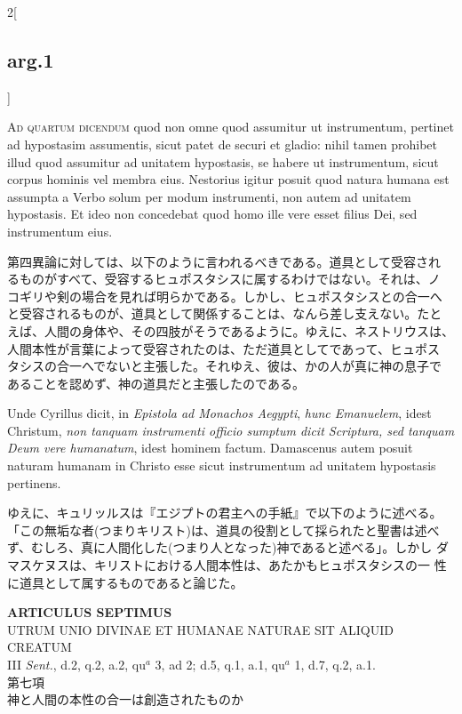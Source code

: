 \documentclass[paper=a4paper,fontsize=10pt,jafontsize=9pt,titlepage]{jlreq}
\begin{document}
\begin{paracol}{2}[\subsection{arg.1}]
\switchcolumn*[\subsection{ad.4}]

{\scshape Ad quartum dicendum} quod non omne quod assumitur ut
instrumentum, pertinet ad hypostasim assumentis, sicut patet de securi
et gladio: nihil tamen prohibet illud quod assumitur ad unitatem
hypostasis, se habere ut instrumentum, sicut corpus hominis vel membra
eius. Nestorius igitur posuit quod natura humana est assumpta a Verbo
solum per modum instrumenti, non autem ad unitatem hypostasis.  Et
ideo non concedebat quod homo ille vere esset filius Dei, sed
instrumentum eius.

\switchcolumn

第四異論に対しては、以下のように言われるべきである。道具として受容され
るものがすべて、受容するヒュポスタシスに属するわけではない。それは、ノ
コギリや剣の場合を見れば明らかである。しかし、ヒュポスタシスとの合一へ
と受容されるものが、道具として関係することは、なんら差し支えない。たと
えば、人間の身体や、その四肢がそうであるように。ゆえに、ネストリウスは、
人間本性が言葉によって受容されたのは、ただ道具としてであって、ヒュポス
タシスの合一へでないと主張した。それゆえ、彼は、かの人が真に神の息子で
あることを認めず、神の道具だと主張したのである。

\switchcolumn*

Unde Cyrillus dicit, in {\itshape Epistola ad Monachos Aegypti},
{\itshape hunc Emanuelem}, idest Christum, {\itshape non tanquam
instrumenti officio sumptum dicit Scriptura, sed tanquam Deum vere
humanatum}, idest hominem factum. Damascenus autem posuit naturam
humanam in Christo esse sicut instrumentum ad unitatem hypostasis
pertinens.

\switchcolumn

ゆえに、キュリッルスは『エジプトの君主への手紙』で以下のように述べる。
「この無垢な者(つまりキリスト)は、道具の役割として採られたと聖書は述べ
ず、むしろ、真に人間化した(つまり人となった)神であると述べる」。しかし
ダマスケヌスは、キリストにおける人間本性は、あたかもヒュポスタシスの一
性に道具として属するものであると論じた。

\end{paracol}
\newpage





{}
\setcounter{section}{7}
\setcounter{subsection}{0}
\begin{center}
{\Large {\bfseries ARTICULUS SEPTIMUS}}\\ {\large UTRUM UNIO DIVINAE ET
HUMANAE NATURAE SIT ALIQUID CREATUM}\\ {\footnotesize III {\itshape
Sent.}, d.2, q.2, a.2, qu$^a$ 3, ad 2; d.5, q.1, a.1, qu$^a$ 1, d.7,
q.2, a.1.}\\ {\Large 第七項\\神と人間の本性の合一は創造されたものか}
\end{center}
\end{document}
